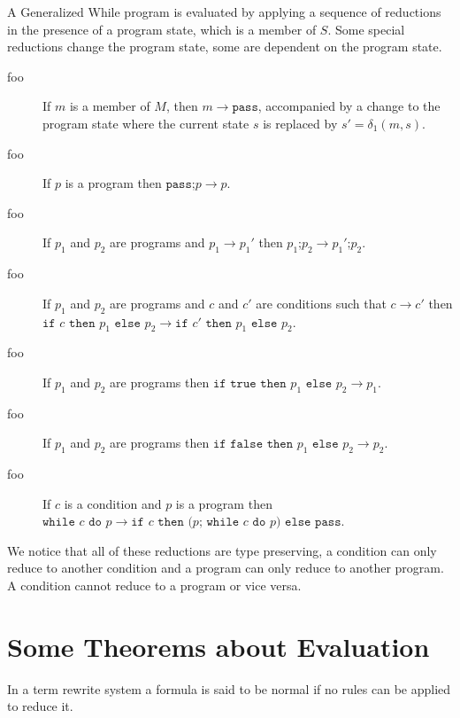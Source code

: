 \documentclass[11pt]{article}
\begin{document}
A Generalized While program is evaluated by applying a sequence of reductions in the presence of a program state, which is a member of $S$.  Some special reductions change the program state, some are dependent on the program state.

\begin{description}


\item[foo] If $m$ is a member of $M$, then $m \rightarrow \texttt{pass}$, accompanied by a change to the program state where the current state $s$ is replaced by $s' = \delta_{1}(m, s)$.
\item[foo] If $p$ is a program then $\texttt{pass;}p \rightarrow p$.
\item[foo] If $p_{1}$ and $p_{2}$ are programs and $p_{1} \rightarrow p_{1}'$ then $p_{1}\texttt{;}p_{2} \rightarrow p_{1}'\texttt{;}p_{2}$.

\item[foo] If $p_{1}$ and $p_{2}$ are programs and $c$ and $c'$ are conditions such that $c \rightarrow c'$ then $\texttt{if } c \texttt{ then } p_{1} \texttt{ else } p_{2} \rightarrow \texttt{if } c' \texttt{ then } p_{1} \texttt{ else } p_{2}$.
\item[foo] If $p_{1}$ and $p_{2}$ are programs then $\texttt{if true then } p_{1} \texttt{ else } p_{2} \rightarrow p_{1}$.
\item[foo] If $p_{1}$ and $p_{2}$ are programs then $\texttt{if false then } p_{1} \texttt{ else } p_{2} \rightarrow p_{2}$.

\item[foo] If $c$ is a condition and $p$ is a program then \\ $\texttt{while } c \texttt{ do } p \rightarrow \texttt{if } c \texttt{ then (} p \texttt{; while } c \texttt{ do } p \texttt{) else pass}$.
\end{description}

We notice that all of these reductions are type preserving, a condition can only reduce to another condition and a program can only reduce to another program.  A condition cannot reduce to a program or vice versa.

\section{Some Theorems about Evaluation}

In a term rewrite system a formula is said to be normal if no rules can be applied to reduce it.
\end{document}
